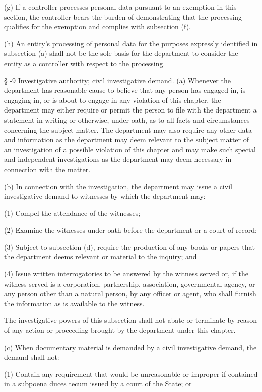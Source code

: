      (g)  If a controller processes personal data pursuant to an exemption in this section, the controller bears the burden of demonstrating that the processing qualifies for the exemption and complies with subsection (f).

     (h)  An entity's processing of personal data for the purposes expressly identified in subsection (a) shall not be the sole basis for the department to consider the entity as a controller with respect to the processing.

     §   -9  Investigative authority; civil investigative demand.  (a)  Whenever the department has reasonable cause to believe that any person has engaged in, is engaging in, or is about to engage in any violation of this chapter, the department may either require or permit the person to file with the department a statement in writing or otherwise, under oath, as to all facts and circumstances concerning the subject matter.  The department may also require any other data and information as the department may deem relevant to the subject matter of an investigation of a possible violation of this chapter and may make such special and independent investigations as the department may deem necessary in connection with the matter.

     (b)  In connection with the investigation, the department may issue a civil investigative demand to witnesses by which the department may:

     (1)  Compel the attendance of the witnesses;

     (2)  Examine the witnesses under oath before the department or a court of record;

     (3)  Subject to subsection (d), require the production of any books or papers that the department deems relevant or material to the inquiry; and

     (4)  Issue written interrogatories to be answered by the witness served or, if the witness served is a corporation, partnership, association, governmental agency, or any person other than a natural person, by any officer or agent, who shall furnish the information as is available to the witness.

     The investigative powers of this subsection shall not abate or terminate by reason of any action or proceeding brought by the department under this chapter.

     (c)  When documentary material is demanded by a civil investigative demand, the demand shall not:

     (1)  Contain any requirement that would be unreasonable or improper if contained in a subpoena duces tecum issued by a court of the State; or

